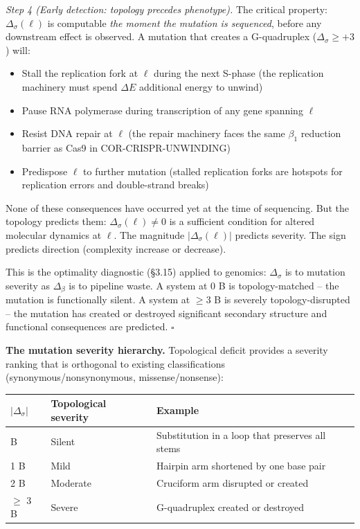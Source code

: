 \documentclass[
  11pt,
]{article}
\newcounter{none} %
\providecommand{\tightlist}{%
  \setlength{\itemsep}{0pt}\setlength{\parskip}{0pt}}
\begin{document}
\emph{Step 4 (Early detection: topology precedes phenotype).} The
critical property: \(\Delta_\sigma(\ell)\) is computable \emph{the
moment the mutation is sequenced}, before any downstream effect is
observed. A mutation that creates a G-quadruplex
(\(\Delta_\sigma \geq +3\)) will:

\begin{itemize}
\tightlist
\item
  Stall the replication fork at \(\ell\) during the next S-phase (the
  replication machinery must spend \(\Delta E\) additional energy to
  unwind)
\item
  Pause RNA polymerase during transcription of any gene spanning
  \(\ell\)
\item
  Resist DNA repair at \(\ell\) (the repair machinery faces the same
  \(\beta_1\) reduction barrier as Cas9 in COR-CRISPR-UNWINDING)
\item
  Predispose \(\ell\) to further mutation (stalled replication forks are
  hotspots for replication errors and double-strand breaks)
\end{itemize}

None of these consequences have occurred yet at the time of sequencing.
But the topology predicts them: \(\Delta_\sigma(\ell) \neq 0\) is a
sufficient condition for altered molecular dynamics at \(\ell\). The
magnitude \(|\Delta_\sigma(\ell)|\) predicts severity. The sign predicts
direction (complexity increase or decrease).

This is the optimality diagnostic (§3.15) applied to genomics:
\(\Delta_\sigma\) is to mutation severity as \(\Delta_\beta\) is to
pipeline waste. A system at 0 B is topology-matched -- the mutation is
functionally silent. A system at \(\geq 3\) B is severely
topology-disrupted -- the mutation has created or destroyed significant
secondary structure and functional consequences are predicted.
\(\square\)

\textbf{The mutation severity hierarchy.} Topological deficit provides a
severity ranking that is orthogonal to existing classifications
(synonymous/nonsynonymous, missense/nonsense):

{\def\LTcaptype{none} %
\begin{longtable}[]{@{}lll@{}}
\toprule\noalign{}
\(|\Delta_\sigma|\) & Topological severity & Example \\
\midrule\noalign{}
\endhead
\bottomrule\noalign{}
\endlastfoot
0 B & Silent & Substitution in a loop that preserves all stems \\
1 B & Mild & Hairpin arm shortened by one base pair \\
2 B & Moderate & Cruciform arm disrupted or created \\
\(\geq\) 3 B & Severe & G-quadruplex created or destroyed \\
\end{longtable}
}
\end{document}
